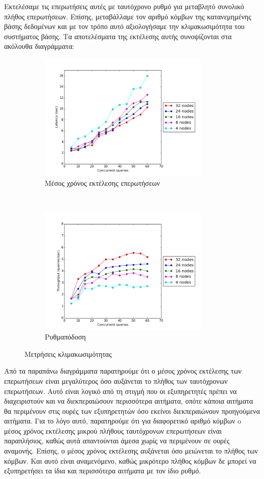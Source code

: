 Εκτελέσαμε τις επερωτήσεις αυτές με ταυτόχρονο ρυθμό για μεταβλητό συνολικό πλήθος επερωτήσεων. Επίσης, μεταβάλλαμε τον αριθμό κόμβων της κατανεμημένης βάσης 
δεδομένων και με τον τρόπο αυτό αξιολογήσαμε την κλιμακωσιμότητα του συστήματος βάσης. Τα αποτελέσματα της εκτέλεσης αυτής συνοψίζονται στα ακόλουθα 
διαγράμματα:

\begin{figure}[H]
    \centering
    \begin{subfigure}[t]{0.5\textwidth}
        \centering
        \includegraphics[height=2.4in]{figures/scalability_latency.png}
        \caption{Μέσος χρόνος εκτέλεσης επερωτήσεων}
    \end{subfigure}%
    ~ 
    \begin{subfigure}[t]{0.5\textwidth}
        \centering
        \includegraphics[height=2.4in]{figures/scalability_throughput.png}
        \caption{Ρυθμαπόδοση}
    \end{subfigure}
    \caption{Μετρήσεις κλιμακωσιμότητας}
\end{figure}

Από τα παραπάνω διαγράμματα παρατηρούμε ότι ο μέσος χρόνος εκτέλεσης των επερωτήσεων είναι μεγαλύτερος όσο αυξάνεται το 
πλήθος των ταυτόχρονων επερωτήσεων. Αυτό είναι λογικό από τη στιγμή που οι εξυπηρετητές πρέπει να διαχειριστούν και να διεκπεραιώσουν περισσότερα αιτήματα, οπότε 
κάποια αιτήματα θα περιμένουν στις ουρές των εξυπηρετητών όσο εκείνοι διεκπεραιώνουν προηγούμενα αιτήματα. Για το λόγο αυτό, 
παρατηρούμε ότι για διαφορετικό αριθμό κόμβων o μέσος χρόνος εκτέλεσης μικρού πλήθους ταυτόχρονων επερωτήσεων είναι παραπλήσιος, καθώς αυτά απαντούνται 
άμεσα χωρίς να περιμένουν σε ουρές αναμονής. 
Επίσης, ο μέσος χρόνος εκτέλεσης αυξάνεται όσο μειώνεται το πλήθος των κόμβων. Και αυτό είναι αναμενόμενο, καθώς μικρότερο πλήθος κόμβων δε μπορεί να εξυπηρετήσει τα ίδια και 
περισσότερα αιτήματα με τον ίδιο ρυθμό.

